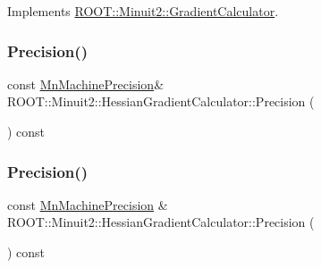 Implements \mbox{\hyperlink{classROOT_1_1Minuit2_1_1GradientCalculator_a1809c1e8a89d32aabf7835e9690c2916}{R\+O\+O\+T\+::\+Minuit2\+::\+Gradient\+Calculator}}.

\mbox{\label{classROOT_1_1Minuit2_1_1HessianGradientCalculator_a256d75d036a5c53b0b679830ca4ac714}} 
\subsubsection{\texorpdfstring{Precision()}{Precision()}\hspace{0.1cm}{\footnotesize\ttfamily [1/3]}}
{\footnotesize\ttfamily const \mbox{\hyperlink{classROOT_1_1Minuit2_1_1MnMachinePrecision}{Mn\+Machine\+Precision}}\& R\+O\+O\+T\+::\+Minuit2\+::\+Hessian\+Gradient\+Calculator\+::\+Precision (\begin{DoxyParamCaption}{ }\end{DoxyParamCaption}) const}

\mbox{\label{classROOT_1_1Minuit2_1_1HessianGradientCalculator_afeacc0589b4f4d6a1e6e6b985f24cc3b}} 
\subsubsection{\texorpdfstring{Precision()}{Precision()}\hspace{0.1cm}{\footnotesize\ttfamily [2/3]}}
{\footnotesize\ttfamily const \mbox{\hyperlink{classROOT_1_1Minuit2_1_1MnMachinePrecision}{Mn\+Machine\+Precision}} \& R\+O\+O\+T\+::\+Minuit2\+::\+Hessian\+Gradient\+Calculator\+::\+Precision (\begin{DoxyParamCaption}{ }\end{DoxyParamCaption}) const}

